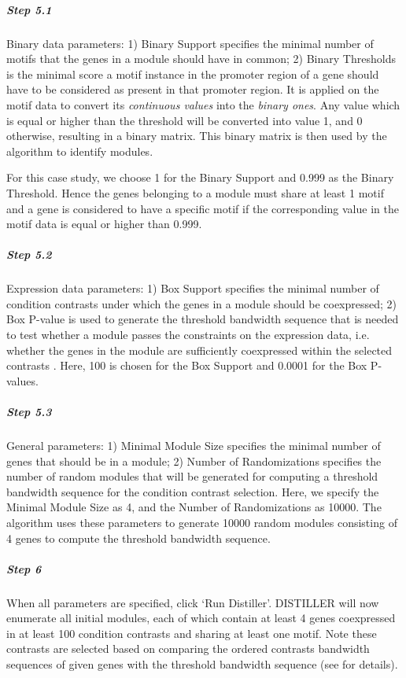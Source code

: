 \begin{adjustwidth}{3mm}{0cm}
\vspace{-5mm}\begin{adjustwidth}{3mm}{0cm}
\nointerlineskip\leavevmode
\subparagraph{Step 5.1} Binary data parameters: 1) Binary Support specifies 
the minimal number of motifs that the genes in a module should have in common; 
2) Binary Thresholds is the minimal score a motif instance in the promoter 
region of a gene should have to be considered as present in that promoter 
region. 
It is applied on the motif data to convert its \textit{continuous values} into 
the \textit{binary ones}. 
Any value which is equal or higher than the threshold will be converted into 
value 1, and 0 otherwise, resulting in a binary matrix. 
This binary matrix is then used by the algorithm to identify modules.

For this case study, we choose 1 for the Binary Support and 
0.999 as the Binary Threshold. Hence the genes belonging to a module must share 
at least 1 motif and a gene is considered to have a specific motif if the 
corresponding value in the motif data is equal or higher than 0.999.

\subparagraph{Step 5.2}	Expression data parameters: 1) Box Support specifies 
the minimal number of condition contrasts under which the genes in a module 
should be coexpressed; 2) Box P-value is used to generate the threshold 
bandwidth sequence that is needed to test whether a module passes the 
constraints on the expression data, i.e. whether the genes in the module 
are sufficiently coexpressed within the selected contrasts \cite{Lemmens2009}. 
Here, 100 is chosen for the Box Support and 0.0001 for the Box P-values.

\subparagraph{Step 5.3} General parameters: 1) Minimal Module Size specifies 
the minimal number of genes that should be in a module; 2) Number of 
Randomizations specifies the number of random modules that will be generated 
for computing a threshold bandwidth sequence for the condition contrast 
selection. 
Here, we specify the Minimal Module Size as 4, and the Number of Randomizations 
as 10000. The algorithm uses these parameters to generate 10000 random modules 
consisting of 4 genes to compute the threshold bandwidth sequence.
\end{adjustwidth}

\subparagraph{Step 6} When all parameters are specified, click `Run 
Distiller'. DISTILLER will now enumerate all initial modules, each of which 
contain at least 4 genes coexpressed in at least 100 condition contrasts and 
sharing at least one motif. Note these contrasts are selected based on 
comparing the ordered contrasts bandwidth sequences of given genes with the 
threshold bandwidth sequence (see \cite{Lemmens2009} for details). 
\end{adjustwidth}

